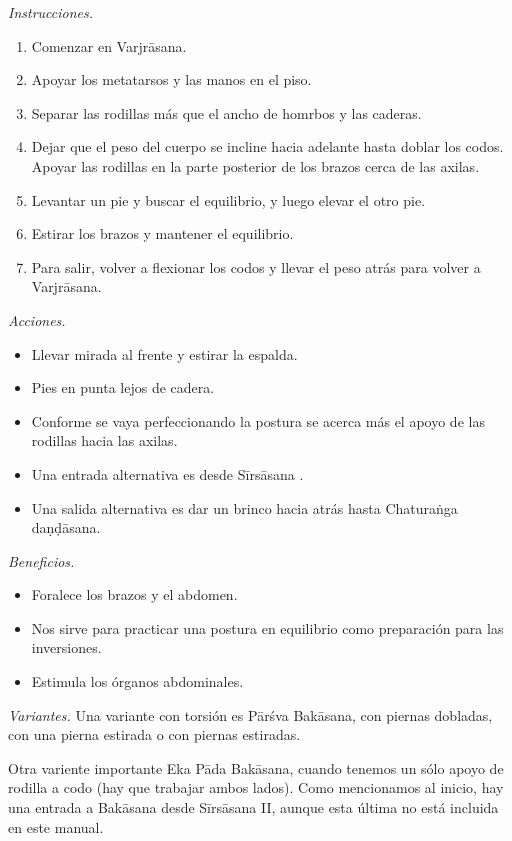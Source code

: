\emph{Instrucciones.}
\begin{enumerate}
\item Comenzar en Varjrāsana.
\item Apoyar los metatarsos y las manos en el
piso.
\item Separar las rodillas más que el ancho
de homrbos y las caderas.
\item Dejar que el peso del cuerpo se incline
hacia adelante hasta doblar los codos. Apoyar
las rodillas en la parte posterior de los
brazos cerca de las axilas.
\item Levantar un pie y buscar el equilibrio,
y luego elevar el otro pie.
\item Estirar los brazos y mantener el
equilibrio.
\item Para salir, volver a flexionar los
codos y llevar el peso atrás para volver a
Varjrāsana.
\end{enumerate}

\emph{Acciones.}
\begin{itemize}
\item Llevar mirada al frente y estirar la
espalda.
\item Pies en punta lejos de cadera.
\item Conforme se vaya perfeccionando la
postura se acerca más el apoyo de las
rodillas hacia las axilas.
\item Una entrada alternativa es desde
Sīrsāsana .
\item Una salida alternativa es dar un brinco
hacia atrás hasta Chaturaṅga daṇḍāsana.
\end{itemize}

\emph{Beneficios.}
\begin{itemize}
\item Foralece los brazos y el abdomen.
\item Nos sirve para practicar una postura en
equilibrio como preparación para las
inversiones.
\item Estimula los órganos abdominales.
\end{itemize}

\emph{Variantes.} Una variante con torsión es
Pārśva Bakāsana, con piernas dobladas, con
una pierna estirada o con piernas estiradas.

Otra variente importante Eka Pāda Bakāsana,
cuando tenemos un sólo apoyo de rodilla a
codo (hay que trabajar ambos lados). Como
mencionamos al inicio, hay una entrada a
Bakāsana desde Sīrsāsana II, aunque esta
última no está incluida en este manual.

